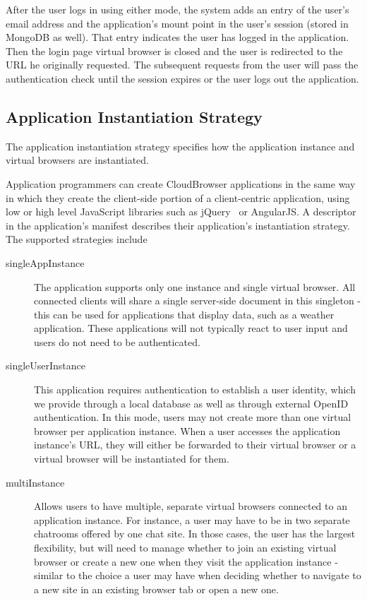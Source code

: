 After the user logs in using either mode, the system adds an entry of the
user's email address and the application's mount point in the user's session
(stored in MongoDB as well). That entry indicates the user has logged in the
application. Then the login page virtual browser is closed and the user is
redirected to  the URL he originally requested. The subsequent requests from
the user will pass the authentication check until the session expires or the
user logs out the application.


\subsection{Application Instantiation Strategy}
\label{sec:appinstantiation}

The application instantiation strategy specifies
how the application instance and virtual browsers are instantiated.

Application programmers can create CloudBrowser applications in the same way in which
they create the client-side portion of a client-centric application, using low or high level
JavaScript libraries such as jQuery~\cite{jquery} or AngularJS.  
A descriptor in the application's manifest describes 
their application's instantiation strategy.
The supported strategies include

\begin{description}

\item[singleAppInstance] The application supports only one instance and single virtual browser.
    All connected clients will share a single server-side document in this singleton - this can be
    used for applications that display data, such as a weather application. These applications will not
    typically react to user input and users do not need to be authenticated.

\item[singleUserInstance]  This application requires authentication to establish a
    user identity, which we provide through a local database as well as through external OpenID
    authentication.   In this mode, users may not create more than one virtual browser per
    application instance.  When a user accesses the application instance's URL, they will either
    be forwarded to their virtual browser or a virtual browser will be instantiated for them.

\item[multiInstance]
    Allows users to have multiple, separate virtual browsers connected to an application
    instance. For instance, a user may have to be in two separate chatrooms offered by one chat site.
    In those cases, the user has the largest flexibility, but will need to manage whether
    to join an existing virtual browser or create a new one when they visit the application instance
    - similar to the choice a user may have when deciding whether to navigate to a new site in
    an existing browser tab or open a new one.

\end{description}

